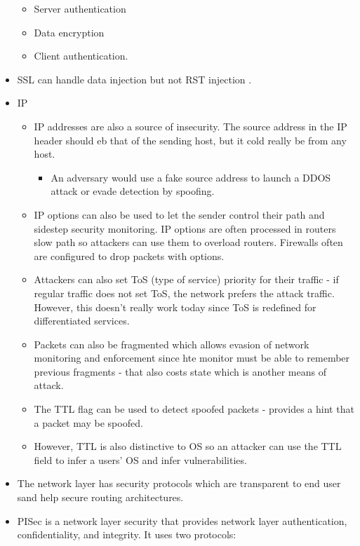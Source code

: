 \documentclass[]{article}
\providecommand{\tightlist}{%
  \setlength{\itemsep}{0pt}\setlength{\parskip}{0pt}}
\begin{document}
\begin{itemize}
  \begin{itemize}
  \tightlist
  \item
    Server authentication
  \item
    Data encryption
  \item
    Client authentication.
  \end{itemize}
\item
  SSL can handle data injection but not RST injection .
\item
  IP

  \begin{itemize}
  \tightlist
  \item
    IP addresses are also a source of insecurity. The source address in
    the IP header should eb that of the sending host, but it cold really
    be from any host.

    \begin{itemize}
    \tightlist
    \item
      An adversary would use a fake source address to launch a DDOS
      attack or evade detection by spoofing.
    \end{itemize}
  \item
    IP options can also be used to let the sender control their path and
    sidestep security monitoring. IP options are often processed in
    routers slow path so attackers can use them to overload routers.
    Firewalls often are configured to drop packets with options.
  \item
    Attackers can also set ToS (type of service) priority for their
    traffic - if regular traffic does not set ToS, the network prefers
    the attack traffic. However, this doesn't really work today since
    ToS is redefined for differentiated services.
  \item
    Packets can also be fragmented which allows evasion of network
    monitoring and enforcement since hte monitor must be able to
    remember previous fragments - that also costs state which is another
    means of attack.
  \item
    The TTL flag can be used to detect spoofed packets - provides a hint
    that a packet may be spoofed.
  \item
    However, TTL is also distinctive to OS so an attacker can use the
    TTL field to infer a users' OS and infer vulnerabilities.
  \end{itemize}
\item
  The network layer has security protocols which are transparent to end
  user sand help secure routing architectures.
\item
  PISec is a network layer security that provides network layer
  authentication, confidentiality, and integrity. It uses two protocols:


\end{itemize}
\end{document}
